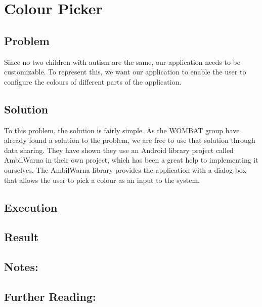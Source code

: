 \section{Colour Picker}%
\subsection{Problem}
Since no two children with autism are the same, our application needs to be customizable. To represent this, we want our application to enable the user to configure the colours of different parts of the application.

\subsection{Solution}
To this problem, the solution is fairly simple. As the WOMBAT group have already found a solution to the problem, we are free to use that solution through data sharing. %
They have shown they use an Android library project called AmbilWarna in their own project, which has been a great help to implementing it ourselves. The AmbilWarna library provides the application with a dialog box that allows the user to pick a colour as an input to the system.

\subsection{Execution}

\subsection{Result}

\subsection{Notes:}

\subsection{Further Reading:}
